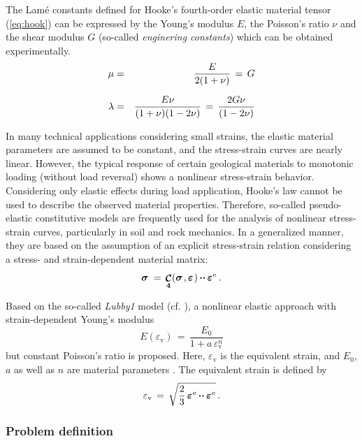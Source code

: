 The Lam{\'{e}} constants defined for Hooke's fourth-order elastic material tensor (\ref{eq:hook}) can be expressed by the Young's modulus $E$, the Poisson's ratio $\nu$ and the shear modulus $G$ (so-called {\sl enginering constants}) which can be obtained experimentally.
\begin{eqnarray}
\mu     & = & \frac{\textstyle{\textstyle{E}}}{\textstyle{\textstyle{2(1+\nu)}}}\,=\,G \\[1.5ex]
\lambda & = & \frac{\textstyle{\textstyle{E\nu}}}{\textstyle{\textstyle{(1+\nu)(1-2\nu)}}}\,=\,\frac{\textstyle{\textstyle{2G\nu}}}{\textstyle{\textstyle{(1-2\nu)}}}
\end{eqnarray}

In many technical applications considering small strains, the elastic material parameters are assumed to be constant, and the stress-strain curves are nearly linear. However, the typical response of certain geological materials to monotonic loading (without load reversal) shows a nonlinear stress-strain behavior. Considering only elastic effects during load application, Hooke's law cannot be used to describe the observed material properties. Therefore, so-called pseudo-elastic constitutive models are frequently used for the analysis of nonlinear stress-strain curves, particularly in soil and rock mechanics. In a generalized manner, they are based on the assumption of an explicit stress-strain relation considering a stress- and strain-dependent material matrix:
\begin{equation}
\mbox{${\mbox{\boldmath${\sigma}$\unboldmath}}^{\:\!}$}\,=\,\mbox{${\mbox{\boldmath$\textstyle{\mathop{\mathcal{C}}\limits_{\bf 4}}$\unboldmath}}$}(\mbox{${\mbox{\boldmath${\sigma}$\unboldmath}}^{\:\!}$},\mbox{${\mbox{\boldmath${\varepsilon}$\unboldmath}}^{\:\!}$})\mbox{\,${\mbox{\boldmath$\cdot\cdot$\unboldmath}}$\,}\mbox{${\mbox{\boldmath${\varepsilon}$\unboldmath}}^{\:\!\mathrm{e}}$}\,.
\label{elasticity_nonlin}
\end{equation}

Based on the so-called {\sl Lubby1} model (cf. \cite{Lux:1984}), a nonlinear elastic approach with strain-dependent Young's modulus
\begin{equation}
E(\varepsilon_{\mathrm{v}})\,=\,\frac{E_0}{1+a\,\varepsilon_{\mathrm{v}}^n}
\label{lubby1_ev}
\end{equation}
but constant Poisson's ratio is proposed. Here, $\varepsilon_{\mathrm{v}}$ is the equivalent strain, and $E_0$, $a$ as well as $n$ are material parameters . The equivalent strain is defined by
\begin{equation}
\varepsilon_{\mathrm{v}}\,=\,
\sqrt{\frac{2}{3}\,\mbox{${\mbox{\boldmath${\varepsilon}$\unboldmath}}^{\:\!\mathrm{e}}$}\mbox{\,${\mbox{\boldmath$\cdot\cdot$\unboldmath}}$\,}\mbox{${\mbox{\boldmath${\varepsilon}$\unboldmath}}^{\:\!\mathrm{e}}$}}\,.
\end{equation}

\subsubsection*{Problem definition}


